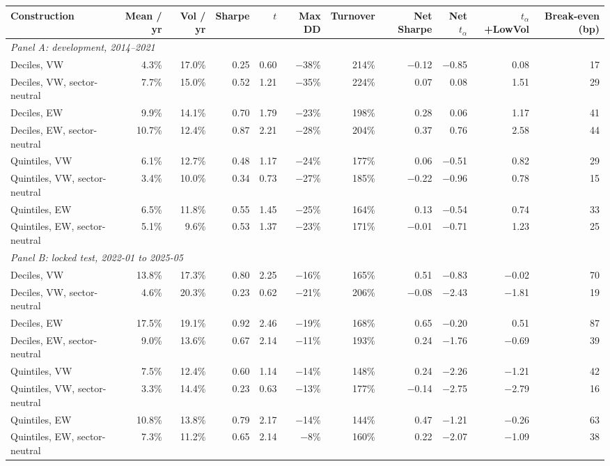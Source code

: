 \begin{tabular}{lrrrrrrrrrr}
\toprule
Construction & Mean / yr & Vol / yr & Sharpe & $t$ & Max DD & Turnover & Net Sharpe & Net $t_\alpha$ & $t_\alpha$ +LowVol & Break-even (bp) \\
\midrule
\multicolumn{11}{l}{\textit{Panel A: development, 2014--2021}} \\
Deciles, VW & 4.3\% & 17.0\% & 0.25 & 0.60 & \ensuremath{-}38\% & 214\% & \ensuremath{-}0.12 & \ensuremath{-}0.85 & 0.08 & 17 \\
Deciles, VW, sector-neutral & 7.7\% & 15.0\% & 0.52 & 1.21 & \ensuremath{-}35\% & 224\% & 0.07 & 0.08 & 1.51 & 29 \\
Deciles, EW & 9.9\% & 14.1\% & 0.70 & 1.79 & \ensuremath{-}23\% & 198\% & 0.28 & 0.06 & 1.17 & 41 \\
Deciles, EW, sector-neutral & 10.7\% & 12.4\% & 0.87 & 2.21 & \ensuremath{-}28\% & 204\% & 0.37 & 0.76 & 2.58 & 44 \\
Quintiles, VW & 6.1\% & 12.7\% & 0.48 & 1.17 & \ensuremath{-}24\% & 177\% & 0.06 & \ensuremath{-}0.51 & 0.82 & 29 \\
Quintiles, VW, sector-neutral & 3.4\% & 10.0\% & 0.34 & 0.73 & \ensuremath{-}27\% & 185\% & \ensuremath{-}0.22 & \ensuremath{-}0.96 & 0.78 & 15 \\
Quintiles, EW & 6.5\% & 11.8\% & 0.55 & 1.45 & \ensuremath{-}25\% & 164\% & 0.13 & \ensuremath{-}0.54 & 0.74 & 33 \\
Quintiles, EW, sector-neutral & 5.1\% & 9.6\% & 0.53 & 1.37 & \ensuremath{-}23\% & 171\% & \ensuremath{-}0.01 & \ensuremath{-}0.71 & 1.23 & 25 \\
\midrule
\multicolumn{11}{l}{\textit{Panel B: locked test, 2022-01 to 2025-05}} \\
Deciles, VW & 13.8\% & 17.3\% & 0.80 & 2.25 & \ensuremath{-}16\% & 165\% & 0.51 & \ensuremath{-}0.83 & \ensuremath{-}0.02 & 70 \\
Deciles, VW, sector-neutral & 4.6\% & 20.3\% & 0.23 & 0.62 & \ensuremath{-}21\% & 206\% & \ensuremath{-}0.08 & \ensuremath{-}2.43 & \ensuremath{-}1.81 & 19 \\
Deciles, EW & 17.5\% & 19.1\% & 0.92 & 2.46 & \ensuremath{-}19\% & 168\% & 0.65 & \ensuremath{-}0.20 & 0.51 & 87 \\
Deciles, EW, sector-neutral & 9.0\% & 13.6\% & 0.67 & 2.14 & \ensuremath{-}11\% & 193\% & 0.24 & \ensuremath{-}1.76 & \ensuremath{-}0.69 & 39 \\
Quintiles, VW & 7.5\% & 12.4\% & 0.60 & 1.14 & \ensuremath{-}14\% & 148\% & 0.24 & \ensuremath{-}2.26 & \ensuremath{-}1.21 & 42 \\
Quintiles, VW, sector-neutral & 3.3\% & 14.4\% & 0.23 & 0.63 & \ensuremath{-}13\% & 177\% & \ensuremath{-}0.14 & \ensuremath{-}2.75 & \ensuremath{-}2.79 & 16 \\
Quintiles, EW & 10.8\% & 13.8\% & 0.79 & 2.17 & \ensuremath{-}14\% & 144\% & 0.47 & \ensuremath{-}1.21 & \ensuremath{-}0.26 & 63 \\
Quintiles, EW, sector-neutral & 7.3\% & 11.2\% & 0.65 & 2.14 & \ensuremath{-}8\% & 160\% & 0.22 & \ensuremath{-}2.07 & \ensuremath{-}1.09 & 38 \\
\bottomrule
\end{tabular}
